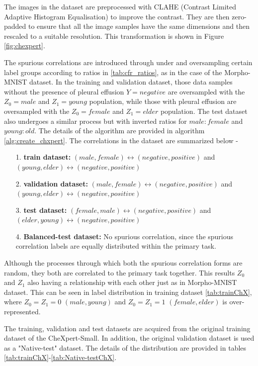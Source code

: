 \documentclass[12pt,DIV14,BCOR12mm,a4paper,footinclude=false,headinclude,parskip=half-,twoside,openright,cleardoublepage=empty,toc=index,bibliography=totoc,listof=totoc]{scrreprt}
\numberwithin{equation}{chapter}
\begin{document}
The images in the dataset are preprocessed with CLAHE (Contrast Limited Adaptive Histogram Equalisation) to improve the contrast. They are then zero-padded to ensure that all the image samples have the same dimensions and then rescaled to a suitable resolution. This transformation is shown in Figure \ref{fig:chexpert}.

The spurious correlations are introduced through under and oversampling certain label groups according to ratios in \ref{tab:cfr_ratios}, as in the case of the Morpho-MNIST dataset. In the training and validation dataset, those data samples without the presence of pleural effusion $Y=negative$ are oversampled with the $Z_0=male$ and $Z_1=young$ population, while those with pleural effusion are oversampled with the $Z_0=female$ and $Z_1=elder$ population. The test dataset also undergoes a similar process but with inverted ratios for $male:female$ and $young:old$. The details of the algorithm are provided in algorithm \ref{alg:create_chxpert}. The correlations in the dataset are summarized below -
\begin{itemize}
  \item[1.] \textbf{train dataset:} $(male,female) \leftrightarrow (negative, positive)$ and $(young,elder) \leftrightarrow (negative, positive)$

  \item[2.] \textbf{validation dataset:} $(male,female) \leftrightarrow (negative, positive)$ and $(young,elder) \leftrightarrow (negative, positive)$
  
  \item[3.] \textbf{test dataset:} $(female,male) \leftrightarrow (negative, positive)$ and $(elder,young) \leftrightarrow (negative, positive)$

  \item[4.] \textbf{Balanced-test dataset:} No spurious correlation, since the spurious correlation labels are equally distributed within the primary task. 
\end{itemize}

Although the processes through which both the spurious correlation forms are random, they both are correlated to the primary task together. This results $Z_0$ and $Z_1$ also having a relationship with each other just as in Morpho-MNIST dataset. This can be seen in label distribution in training dataset \ref{tab:trainChX}, where $Z_0=Z_1=0$ $(male, young)$ and $Z_0=Z_1=1$ $(female,elder)$ is over-represented.

The training, validation and test datasets are acquired from the original training dataset of the CheXpert-Small. In addition, the original validation dataset is used as a "Native-test" dataset. The details of the distribution are provided in tables \ref{tab:trainChX}-\ref{tab:Native-testChX}.
\end{document}
